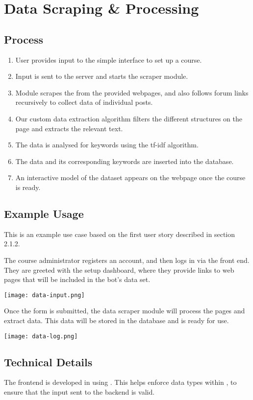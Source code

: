 \section{Data Scraping \& Processing}
\subsection{Process}
\begin{enumerate}
    \item{User provides input to the simple interface to set up a course.}
    \item{Input is sent to the server and starts the scraper module.}
    \item{Module scrapes the  from the provided webpages, and also follows forum links recursively to collect data of individual posts.}
    \item{Our custom data extraction algorithm filters the different structures on the page and extracts the relevant text.}
    \item{The data is analysed for keywords using the tf-idf algorithm.}
    \item{The data and its corresponding keywords are inserted into the database.}
    \item{An interactive model of the dataset appears on the webpage once the course is ready.}
\end{enumerate}

\subsection{Example Usage}
This is an example use case based on the first user story described in section 2.1.2.

The course administrator registers an account, and then logs in via the front end. They are greeted with the setup dashboard, where they provide links to web pages that will be included in the bot's data set.

\texttt{[image: data-input.png]}

Once the form is submitted, the data scraper module will process the pages and extract data. This data will be stored in the database and is ready for use.

\texttt{[image: data-log.png]}

\subsection{Technical Details}
The frontend is developed in  using . This helps enforce data types within , to ensure that the input sent to the backend is valid.

